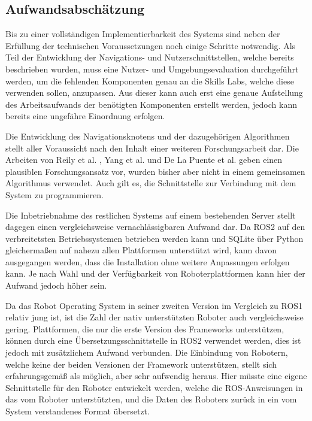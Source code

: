 \subsection{Aufwandsabschätzung}

Bis zu einer vollständigen Implementierbarkeit des Systems sind neben der Erfüllung der technischen Voraussetzungen noch einige Schritte notwendig. Als Teil der Entwicklung der Navigations- und Nutzerschnittstellen, welche bereits beschrieben wurden, muss eine Nutzer- und Umgebungsevaluation durchgeführt werden, um die fehlenden Komponenten genau an die Skills Labs, welche diese verwenden sollen, anzupassen. Aus dieser kann auch erst eine genaue Aufstellung des Arbeitsaufwands der benötigten Komponenten erstellt werden, jedoch kann bereits eine ungefähre Einordnung erfolgen.

Die Entwicklung des Navigationsknotens und der dazugehörigen Algorithmen stellt aller Voraussicht nach den Inhalt einer weiteren Forschungsarbeit dar. Die Arbeiten von Reily et al. \cite{silentSwarm}, Yang et al. \cite{2DPlan} und De La Puente et al. \cite{assistRobot} geben einen plausiblen Forschungsansatz vor, wurden bisher aber nicht in einem gemeinsamen Algorithmus verwendet. Auch gilt es, die Schnittstelle zur Verbindung mit dem System zu programmieren.

Die Inbetriebnahme des restlichen Systems auf einem bestehenden Server stellt dagegen einen vergleichsweise vernachlässigbaren Aufwand dar. Da ROS2 auf den verbreitetsten Betriebssystemen betrieben werden kann und SQLite über Python gleichermaßen auf nahezu allen Plattformen unterstützt wird, kann davon ausgegangen werden, dass die Installation ohne weitere Anpassungen erfolgen kann. Je nach Wahl und der Verfügbarkeit von Roboterplattformen kann hier der Aufwand jedoch höher sein.

Da das Robot Operating System in seiner zweiten Version im Vergleich zu ROS1 relativ jung ist, ist die Zahl der nativ unterstützten Roboter auch vergleichsweise gering. Plattformen, die nur die erste Version des Frameworks unterstützen, können durch eine Übersetzungsschnittstelle in ROS2 verwendet werden, dies ist jedoch mit zusätzlichem Aufwand verbunden. Die Einbindung von Robotern, welche keine der beiden Versionen der Framework unterstützen, stellt sich erfahrungsgemäß als möglich, aber sehr aufwendig heraus. Hier müsste eine eigene Schnittstelle für den Roboter entwickelt werden, welche die ROS-Anweisungen in das vom Roboter unterstützten, und die Daten des Roboters zurück in ein vom System verstandenes Format übersetzt.

